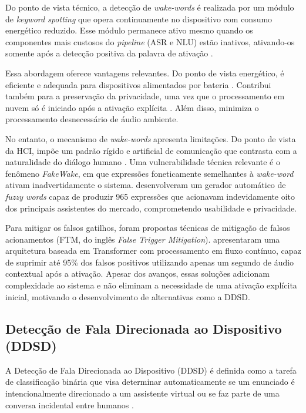 \documentclass[
    12pt,                %
    openright,           %
    oneside,             %
    a4paper,             %
    english,             %
    brazil               %
]{abntex2}
\begin{document}
Do ponto de vista técnico, a detecção de \textit{wake-words} é realizada por um módulo de \textit{keyword spotting} que opera continuamente no dispositivo com consumo energético reduzido. Esse módulo permanece ativo mesmo quando os componentes mais custosos do \textit{pipeline} (ASR e NLU) estão inativos, ativando-os somente após a detecção positiva da palavra de ativação \cite{Garg2021}.

Essa abordagem oferece vantagens relevantes. Do ponto de vista energético, é eficiente e adequada para dispositivos alimentados por bateria \cite{Shin2023}. Contribui também para a preservação da privacidade, uma vez que o processamento em nuvem só é iniciado após a ativação explícita \cite{Nie2021}. Além disso, minimiza o processamento desnecessário de áudio ambiente.

No entanto, o mecanismo de \textit{wake-words} apresenta limitações. Do ponto de vista da HCI, impõe um padrão rígido e artificial de comunicação que contrasta com a naturalidade do diálogo humano \cite{Nie2021}. Uma vulnerabilidade técnica relevante é o fenômeno \textit{FakeWake}, em que expressões foneticamente semelhantes à \textit{wake-word} ativam inadvertidamente o sistema.  desenvolveram um gerador automático de \textit{fuzzy words} capaz de produzir 965 expressões que acionavam indevidamente oito dos principais assistentes do mercado, comprometendo usabilidade e privacidade. 

Para mitigar os falsos gatilhos, foram propostas técnicas de mitigação de falsos acionamentos (FTM, do inglês \textit{False Trigger Mitigation}).  apresentaram uma arquitetura baseada em Transformer com processamento em fluxo contínuo, capaz de suprimir até 95\% dos falsos positivos utilizando apenas um segundo de áudio contextual após a ativação. Apesar dos avanços, essas soluções adicionam complexidade ao sistema e não eliminam a necessidade de uma ativação explícita inicial, motivando o desenvolvimento de alternativas como a DDSD.


\subsection{Detecção de Fala Direcionada ao Dispositivo (DDSD)}

A Detecção de Fala Direcionada ao Dispositivo (DDSD) é definida como a tarefa de classificação binária que visa determinar automaticamente se um enunciado é intencionalmente direcionado a um assistente virtual ou se faz parte de uma conversa incidental entre humanos \cite{Mallidi2018, Wagner2024}.
\end{document}
